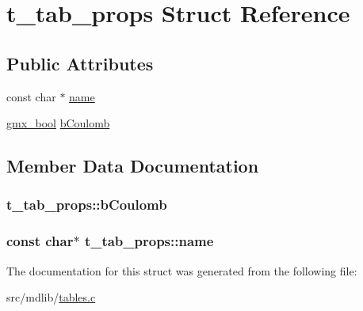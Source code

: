 \hypertarget{structt__tab__props}{\section{t\-\_\-tab\-\_\-props \-Struct \-Reference}
\label{structt__tab__props}
}
\subsection*{\-Public \-Attributes}
\begin{DoxyCompactItemize}
\item 
const char $\ast$ \hyperlink{structt__tab__props_a446f5bd9fbaa95220c17ca116667a705}{name}
\item 
\hyperlink{include_2types_2simple_8h_a8fddad319f226e856400d190198d5151}{gmx\-\_\-bool} \hyperlink{structt__tab__props_a4b35a94f2c3429194866d00c3d1b5714}{b\-Coulomb}
\end{DoxyCompactItemize}


\subsection{\-Member \-Data \-Documentation}
\hypertarget{structt__tab__props_a4b35a94f2c3429194866d00c3d1b5714}{
\subsubsection[{b\-Coulomb}]{ {\bf t\-\_\-tab\-\_\-props\-::b\-Coulomb}}}\label{structt__tab__props_a4b35a94f2c3429194866d00c3d1b5714}
\hypertarget{structt__tab__props_a446f5bd9fbaa95220c17ca116667a705}{
\subsubsection[{name}]{\setlength{\rightskip}{0pt plus 5cm}const char$\ast$ {\bf t\-\_\-tab\-\_\-props\-::name}}}\label{structt__tab__props_a446f5bd9fbaa95220c17ca116667a705}


\-The documentation for this struct was generated from the following file\-:\begin{DoxyCompactItemize}
\item 
src/mdlib/\hyperlink{tables_8c}{tables.\-c}\end{DoxyCompactItemize}
